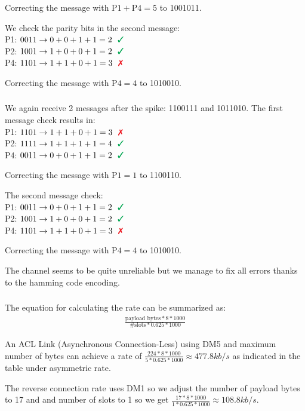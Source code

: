 \documentclass[12pt]{article}
\newcommand{\multipartexercise}{\addtocounter{subsection}{1}\setcounter{subsubsection}{0}}
\newcommand{\exercisepart}{\subsubsection{}}
\begin{document}
Correcting the message with $\text{P1} + \text{P4} = 5$ to 1001011.

\bigskip

We check the parity bits in the second message:
\\
P1: $0011 \rightarrow 0+0+1+1=2 \ \color{Green} \ \text{\ding{51}}$ \\
P2: $1001 \rightarrow 1+0+0+1=2 \ \color{Green} \ \text{\ding{51}}$ \\
P4: $1101 \rightarrow 1+1+0+1=3 \ \color{Red} \ \text{\ding{55}}$

Correcting the message with $\text{P4} = 4$ to 1010010.

\exercisepart
We again receive 2 messages after the spike: 1100111 and 1011010.
The first message check results in:
\\
P1: $1101 \rightarrow 1+1+0+1=3 \ \color{Red} \ \text{\ding{55}}$ \\
P2: $1111 \rightarrow 1+1+1+1=4 \ \color{Green} \ \text{\ding{51}}$ \\
P4: $0011 \rightarrow 0+0+1+1=2 \ \color{Green} \ \text{\ding{51}}$

Correcting the message with $\text{P1} = 1$ to 1100110.

\bigskip

The second message check:
\\
P1: $0011 \rightarrow 0+0+1+1=2 \ \color{Green} \ \text{\ding{51}}$ \\
P2: $1001 \rightarrow 1+0+0+1=2 \ \color{Green} \ \text{\ding{51}}$ \\
P4: $1101 \rightarrow 1+1+0+1=3 \ \color{Red} \ \text{\ding{55}}$

Correcting the message with $\text{P4} = 4$ to 1010010.

\bigskip

The channel seems to be quite unreliable but we manage to fix all errors thanks to the hamming code encoding.

\multipartexercise
\exercisepart
The equation for calculating the rate can be summarized as:
\begin{align*}
  \frac{\text{payload bytes}*8*1000}{\text{\# slots}*0.625*1000}
\end{align*}

An ACL Link (Asynchronous Connection-Less) using DM5 and maximum number of bytes can achieve a rate of $\frac{224*8*1000}{5*0.625*1000} \approx 477.8kb/s$ as indicated in the table under asymmetric rate.

The reverse connection rate uses DM1 so we adjust the number of payload bytes to 17 and and number of slots to 1 so we get $\frac{17*8*1000}{1*0.625*1000} \approx 108.8kb/s$.
\end{document}
